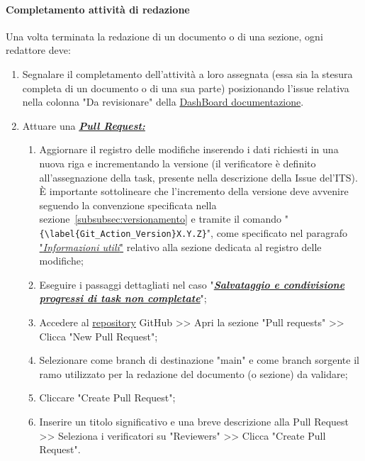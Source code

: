 \paragraph*{\textbf{Completamento attività di redazione}}
Una volta terminata la redazione di un documento o di una sezione, ogni redattore deve:
\begin{enumerate}
    \item Segnalare il completamento dell'attività a loro assegnata (essa sia la stesura completa di un documento o di una sua parte) posizionando l'issue relativa nella colonna "Da revisionare" della \href{https://github.com/orgs/ByteOps-swe/projects/1/views/1}{DashBoard documentazione}.
    \item Attuare una \hyperlink{par:creazionePR}{\textit{\textbf{Pull Request:}}}
          \begin{enumerate}
              \item Aggiornare il registro delle modifiche inserendo i dati richiesti in una nuova riga e incrementando la versione (il verificatore è definito all'assegnazione della task, presente nella descrizione della Issue del'ITS).
              È importante sottolineare che l'incremento della versione deve avvenire seguendo la convenzione specificata nella sezione~\ref{subsubsec:versionamento} e tramite il comando "\verb|{\label{Git_Action_Version}X.Y.Z}|", come specificato nel paragrafo \hyperlink{par:infoUtiliRegistroMod}{"\textit{Informazioni utili}"} relativo alla sezione dedicata al registro delle modifiche;
              \item Eseguire i passaggi dettagliati nel caso "\hyperlink{par:salvataggioecondivisioneprogressitasknoncompletate}{\textit{\textbf{Salvataggio e condivisione progressi di task non completate}}}";
              \item Accedere al \href{https://github.com/ByteOps-swe/Sorgente-documenti.git}{repository} GitHub >> Apri la sezione "Pull requests" >> Clicca "New Pull Request";
              \item Selezionare come branch di destinazione "main" e come branch sorgente il ramo utilizzato per la redazione del documento (o sezione) da validare;
              \item Cliccare "Create Pull Request";
              \item Inserire un titolo significativo e una breve descrizione alla Pull Request >> Seleziona i verificatori su "Reviewers" >> Clicca "Create Pull Request".
          \end{enumerate}
\end{enumerate}

